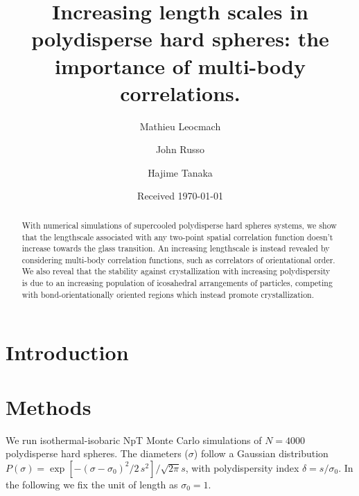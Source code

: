 \documentclass[twocolumn,superscriptaddress]{revtex4-1}
\begin{document}
\title{Increasing length scales in polydisperse hard spheres: the importance of multi-body correlations.} 

\author{Mathieu Leocmach}
\author{John Russo}
\author{Hajime Tanaka}

\date{Received \today}

\begin{abstract}
With numerical simulations of supercooled polydisperse hard spheres systems,
we show that the lengthscale associated with any two-point spatial correlation function
doesn't increase towards the glass transition. An increasing lengthscale is instead revealed
by considering multi-body correlation functions, such as correlators of orientational order.
We also reveal that the stability against crystallization with increasing polydispersity
is due to an increasing population of icosahedral arrangements of particles, competing with bond-orientationally
oriented regions which instead promote crystallization.

\end{abstract}

\maketitle

\section{Introduction}


\section{Methods}
We run isothermal-isobaric NpT Monte Carlo simulations of $N=4000$ polydisperse hard spheres.
The diameters ($\sigma$) follow a Gaussian distribution $P(\sigma)=\exp{\left[-(\sigma-\sigma_0)^2/2\,s^2\right]}/\sqrt{2\pi} s$,
with polydispersity index $\delta=s/\sigma_0$. In the following we fix the unit of length as $\sigma_0=1$.
\end{document}
